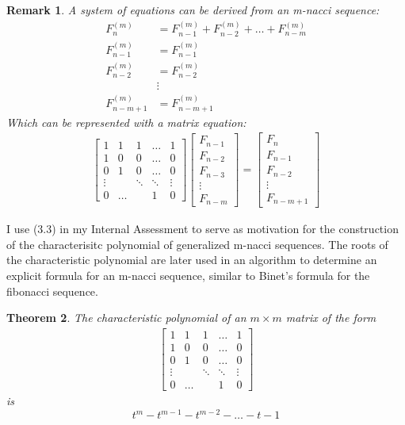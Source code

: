 \documentclass{article}
\newtheorem{theorem}{Theorem}[section]
\newtheorem{remark}[theorem]{Remark}
\begin{document}
\begin{remark}
    A system of equations can be derived from an m-nacci sequence:
    \begin{align*}
        F_n^{(m)} &= F^{(m)}_{n-1}+F^{(m)}_{n-2}+\dots+F^{(m)}_{n-m} \\ 
        F_{n-1}^{(m)} &= F_{n-1}^{(m)} \\ 
        F_{n-2}^{(m)} &= F_{n-2}^{(m)} \\
        &\vdots \\ 
        F_{n-m+1}^{(m)} &= F_{n-m+1}^{(m)}
    \end{align*}
    Which can be represented with a matrix equation:
    \begin{align*}
        \begin{bmatrix} 
            1 & 1 & 1 & \dots & 1 \\
            1 & 0 & 0 & \dots & 0 \\
            0 & 1 & 0 & \dots & 0 \\
            \vdots & & \ddots & \ddots  & \vdots \\ 
            0 & \dots & & 1 & 0
        \end{bmatrix}
        \begin{bmatrix} 
            F_{n-1} \\
            F_{n-2} \\
            F_{n-3} \\
            \vdots \\ 
            F_{n-m}
        \end{bmatrix} = 
        \begin{bmatrix} 
            F_{n} \\
            F_{n-1} \\
            F_{n-2} \\
            \vdots \\ 
            F_{n-m+1}
        \end{bmatrix}
    \end{align*}
\end{remark}

I use (3.3) in my Internal Assessment to serve as motivation for the construction of the characterisitc polynomial of generalized m-nacci sequences. The roots of the characteristic polynomial are later used in an algorithm to determine an explicit formula for an m-nacci sequence, similar to Binet's formula for the fibonacci sequence.

\begin{theorem}
    The characteristic polynomial of an $m\times m$ matrix of the form 
    \begin{align*}
    \begin{bmatrix} 
        1 & 1 & 1 & \dots & 1 \\
        1 & 0 & 0 & \dots & 0 \\
        0 & 1 & 0 & \dots & 0 \\
        \vdots & & \ddots & \ddots  & \vdots \\ 
        0 & \dots & & 1 & 0
    \end{bmatrix}
    \end{align*}
    is 
    $$t^m-t^{m-1}-t^{m-2}-\dots-t-1$$
\end{theorem}
\end{document}
